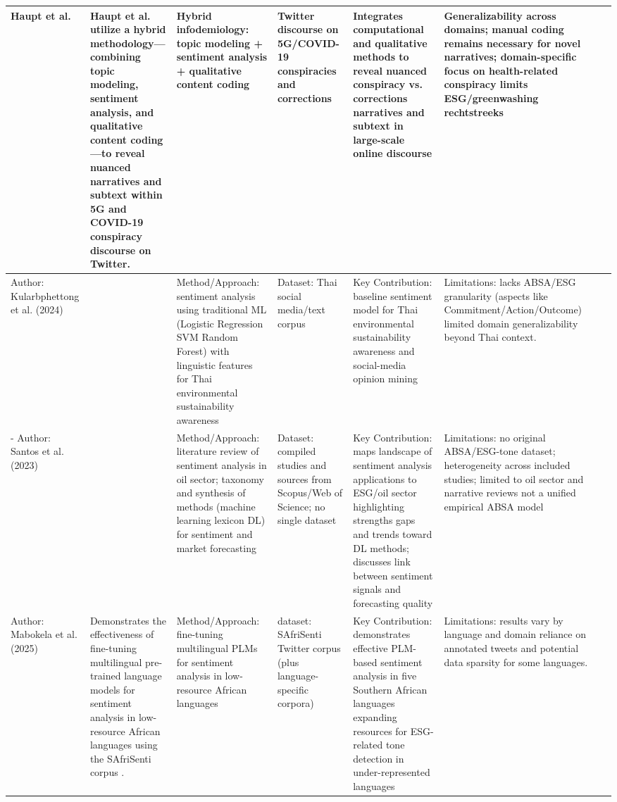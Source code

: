 \documentclass{article}
\begin{document}
\begin{landscape}
\begin{longtable}{p{1.8cm}
p{2.6cm}
p{3.4cm}
p{2.6cm}
p{3.5cm}
p{3.5cm}
p{0.8cm}}
Haupt et al. & Haupt et al.  \parencite{michael_robert_haupt_ccbbb1b9} utilize a hybrid methodology—combining topic modeling, sentiment analysis, and qualitative content coding—to reveal nuanced narratives and subtext within 5G and COVID-19 conspiracy discourse on Twitter. & Hybrid infodemiology: topic modeling + sentiment analysis + qualitative content coding & Twitter discourse on 5G/COVID-19 conspiracies and corrections & Integrates computational and qualitative methods to reveal nuanced conspiracy vs. corrections narratives and subtext in large-scale online discourse & Generalizability across domains; manual coding remains necessary for novel narratives; domain-specific focus on health-related conspiracy limits ESG/greenwashing rechtstreeks & ~ \\ \hline
Author: Kularbphettong et al. (2024) & ~ & Method/Approach: sentiment analysis using traditional ML (Logistic Regression SVM Random Forest) with linguistic features for Thai environmental sustainability awareness & Dataset: Thai social media/text corpus & Key Contribution: baseline sentiment model for Thai environmental sustainability awareness and social-media opinion mining & Limitations: lacks ABSA/ESG granularity (aspects like Commitment/Action/Outcome) limited domain generalizability beyond Thai context. & ~ \\ \hline
- Author: Santos et al. (2023) & ~ & Method/Approach: literature review of sentiment analysis in oil sector; taxonomy and synthesis of methods (machine learning lexicon DL) for sentiment and market forecasting & Dataset: compiled studies and sources from Scopus/Web of Science; no single dataset & Key Contribution: maps landscape of sentiment analysis applications to ESG/oil sector highlighting strengths gaps and trends toward DL methods; discusses link between sentiment signals and forecasting quality & Limitations: no original ABSA/ESG-tone dataset; heterogeneity across included studies; limited to oil sector and narrative reviews not a unified empirical ABSA model & ~ \\ \hline
Author: Mabokela et al. (2025) & Demonstrates the effectiveness of fine-tuning multilingual pre-trained language models for sentiment analysis in low-resource African languages using the SAfriSenti corpus  \parencite{koena_ronny_mabokela_093dcf86}. & Method/Approach: fine-tuning multilingual PLMs for sentiment analysis in low-resource African languages & dataset: SAfriSenti Twitter corpus (plus language-specific corpora) & Key Contribution: demonstrates effective PLM-based sentiment analysis in five Southern African languages expanding resources for ESG-related tone detection in under-represented languages & Limitations: results vary by language and domain reliance on annotated tweets and potential data sparsity for some languages. & ~ \\ \hline

\end{longtable}
\end{landscape}
\end{document}

